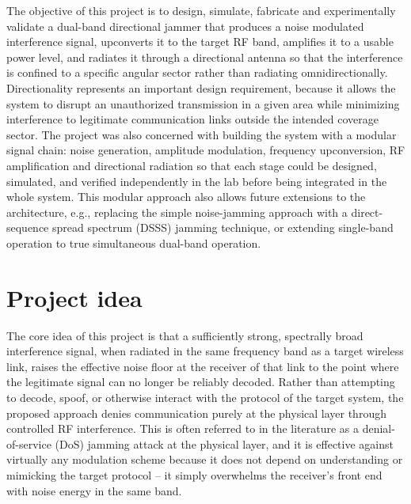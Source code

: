 \documentclass[12pt,a4paper]{report}
\begin{document}
	The objective of this project is to design, simulate, fabricate and experimentally validate a dual-band directional jammer that produces a noise modulated interference signal, upconverts it to the target RF band, amplifies it to a usable power level, and radiates it through a directional antenna so that the interference is confined to a specific angular sector rather than radiating omnidirectionally. Directionality represents an important design requirement, because it allows the system to disrupt an unauthorized transmission in a given area while minimizing interference to legitimate communication links outside the intended coverage sector. The project was also concerned with building the system with a modular signal chain: noise generation, amplitude modulation, frequency upconversion, RF amplification and directional radiation so that each stage could be designed, simulated, and verified independently in the lab before being integrated in the whole system. This modular approach also allows future extensions to the
	architecture, e.g., replacing the simple noise-jamming approach with a direct-sequence spread spectrum (DSSS) jamming technique, or extending single-band operation to true simultaneous dual-band operation.
	
	\section{Project idea}
	The core idea of this project is that a sufficiently strong, spectrally broad interference signal, when radiated in the same frequency band as a target wireless link, raises the effective noise floor at the receiver of that link to the point where the legitimate signal can no longer be reliably decoded. Rather than attempting to decode, spoof, or otherwise interact with the protocol of the target system, the proposed approach denies communication purely at the physical layer through controlled RF interference. This is often referred to in the literature as a denial-of-service (DoS) jamming attack at the physical layer, and it is effective against virtually any modulation scheme because it does not depend on understanding or mimicking the target protocol – it simply overwhelms the receiver’s front end with noise energy in the same band.
	\vspace{0.5cm}
	
\end{document}
